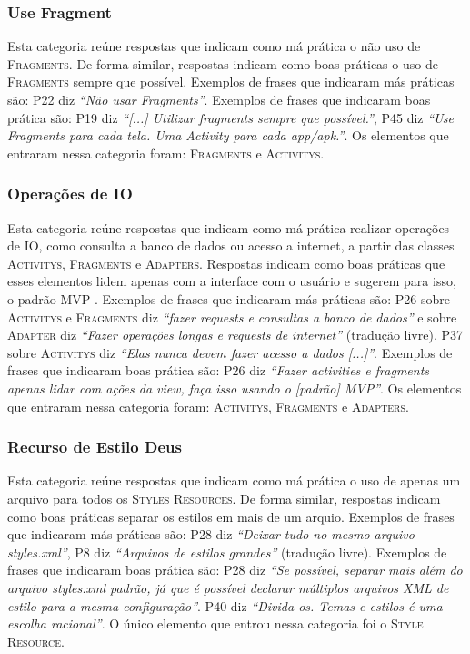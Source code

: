 \subsubsection{Use Fragment}
Esta categoria re\'une respostas que indicam como m\'a pr\'atica o n\~ao uso de \textsc{Fragments}. De forma similar, respostas indicam como boas pr\'aticas o uso de \textsc{Fragments} sempre que poss\'ivel. Exemplos de frases que indicaram m\'as pr\'aticas s\~ao: P22 diz \textit{``N\~ao usar Fragments''}. Exemplos de frases que indicaram boas pr\'atica s\~ao: P19 diz \textit{``[...] Utilizar fragments sempre que poss\'ivel.''}, P45 diz \textit{``Use Fragments para cada tela. Uma Activity para cada app/apk.''}. Os elementos que entraram nessa categoria foram: \textsc{Fragments} e \textsc{Activitys}. 

\subsubsection{Opera\c{c}\~oes de IO}
Esta categoria re\'une respostas que indicam como m\'a pr\'atica realizar opera\c{c}\~oes de IO, como consulta a banco de dados ou acesso a internet, a partir das classes \textsc{Activitys}, \textsc{Fragments} e \textsc{Adapters}. Respostas indicam como boas pr\'aticas que esses elementos lidem apenas com a interface com o usu\'ario e sugerem para isso, o padr\~ao MVP \cite{WikipediaMVP, MartinFowlerGUIArchitectures}. Exemplos de frases que indicaram m\'as pr\'aticas s\~ao: P26 sobre \textsc{Activitys} e \textsc{Fragments} diz \textit{``fazer requests e consultas a banco de dados''} e sobre \textsc{Adapter} diz \textit{``Fazer opera\c{c}\~oes longas e requests de internet''} (tradu\c{c}\~ao livre). P37 sobre \textsc{Activitys} diz \textit{``Elas nunca devem fazer acesso a dados [...]''}. Exemplos de frases que indicaram boas pr\'atica s\~ao: P26 diz \textit{``Fazer activities e fragments apenas lidar com a\c{c}\~oes da view, fa\c{c}a isso usando o [padr\~ao] MVP''}. Os elementos que entraram nessa categoria foram: \textsc{Activitys}, \textsc{Fragments} e \textsc{Adapters}. 

\subsubsection{Recurso de Estilo Deus}
Esta categoria re\'une respostas que indicam como m\'a pr\'atica o uso de apenas um arquivo para todos os \textsc{Styles Resources}. De forma similar, respostas indicam como boas pr\'aticas separar os estilos em mais de um arquio. Exemplos de frases que indicaram m\'as pr\'aticas s\~ao: P28 diz \textit{``Deixar tudo no mesmo arquivo styles.xml''}, P8 diz \textit{``Arquivos de estilos grandes''} (tradu\c{c}\~ao livre). Exemplos de frases que indicaram boas pr\'atica s\~ao: P28 diz \textit{``Se poss\'ivel, separar mais al\'em do arquivo styles.xml padr\~ao, j\'a que \'e poss\'ivel declarar m\'ultiplos arquivos XML de estilo para a mesma configura\c{c}\~ao''}. P40 diz \textit{``Divida-os. Temas e estilos \'e uma escolha racional''}. O \'unico elemento que entrou nessa categoria foi o \textsc{Style Resource}. 

